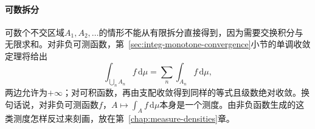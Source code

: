 \paragraph{可数拆分}
可数个不交区域$A_1,A_2,\dots$的情形不能从有限拆分直接得到，因为需要交换积分与无限求和。对非负可测函数，第~\ref{sec:integ-monotone-convergence}小节的单调收敛定理将给出
\begin{equation}
 \int_{\bigcup_nA_n}f\,\mathrm d\mu=\sum_n\int_{A_n}f\,\mathrm d\mu,
 \label{eq:integ-domain-countable}
\end{equation}
两边允许为$+\infty$；对可积函数，再由支配收敛得到同样的等式且级数绝对收敛。换句话说，对非负可测函数$f$，$A\mapsto\int_Af\,\mathrm d\mu$本身是一个测度。由非负函数生成的这类测度怎样反过来刻画，放在第~\ref{chap:measure-densities}章。
